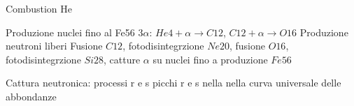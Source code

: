 \begin{frame}{Combustion He}

\end{frame}

\begin{frame}{Produzione nuclei fino al Fe56}
3$\alpha$: $He4+\alpha\to C12$, $C12+\alpha\to O16$
Produzione neutroni liberi
Fusione $C12$, fotodisintegrzione $Ne20$, fusione $O16$, fotodisintegrzione $Si28$, catture $\alpha$ su nuclei fino a produzione $Fe56$
\end{frame}

\begin{frame}{Cattura neutronica: processi r e s}
picchi r e s nella nella curva universale delle abbondanze
\end{frame}
